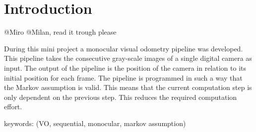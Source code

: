 \section{Introduction}
@Miro @Milan, read it trough please

During this mini project a monocular visual odometry pipeline was developed. This pipeline takes the consecutive gray-scale images of a single digital camera as input. 
The output of the pipeline is the position of the camera in relation to its initial position for each frame.
The pipeline is programmed in such a way that the Markov assumption is valid. This means that the current computation step is only dependent on the previous step. This reduces the required computation effort.

keywords:
(\textcolor[rgb]{0.2,0.8,0.2}{VO}, sequential,\textcolor[rgb]{0.2,0.8,0.2}{ monocular, markov assumption})